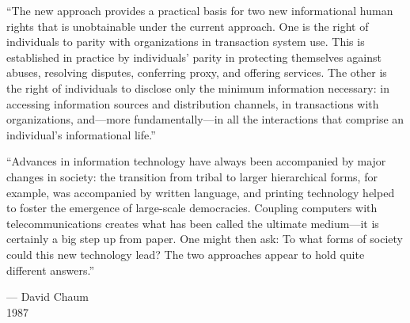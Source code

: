 ``The new approach provides a practical basis for two new informational human rights that is unobtainable under the current approach. One is the right of individuals to parity with organizations in transaction system use. This is established in practice by individuals' parity in protecting themselves against abuses, resolving disputes, conferring proxy, and offering services. The other is the right of individuals to disclose only the minimum information necessary: in accessing information sources and distribution channels, in transactions with organizations, and---more fundamentally---in all the interactions that comprise an individual's informational life.''

``Advances in information technology have always been accompanied by major changes in society: the transition from tribal to larger hierarchical forms, for example, was accompanied by written language, and printing technology helped to foster the emergence of large-scale democracies. Coupling computers with telecommunications creates what has been called the ultimate medium---it is certainly a big step up from paper. One might then ask: To what forms of society could this new technology lead? The two approaches appear to hold quite different answers.''


\begin{flushright}
    --- David Chaum \\ 1987~\cite{Chaum85}
\end{flushright}

\normalsize